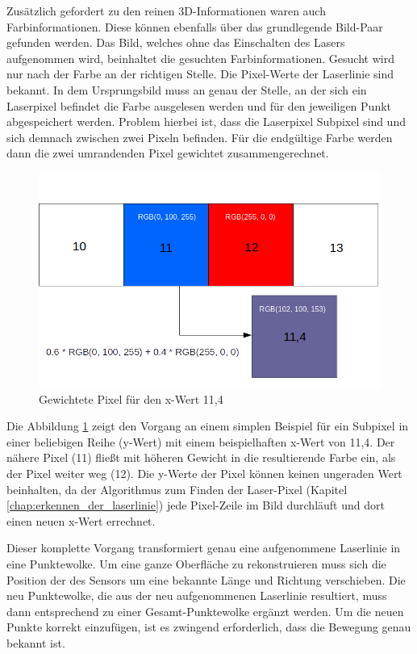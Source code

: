 	Zusätzlich gefordert zu den reinen 3D-Informationen waren auch Farbinformationen. Diese können ebenfalls über das grundlegende Bild-Paar gefunden werden. Das Bild, welches ohne das Einschalten des Lasers aufgenommen wird, beinhaltet die gesuchten Farbinformationen. Gesucht wird nur nach der Farbe an der richtigen Stelle. Die Pixel-Werte der Laserlinie sind bekannt. In dem Ursprungsbild muss an genau der Stelle, an der sich ein Laserpixel befindet die Farbe ausgelesen werden und für den jeweiligen Punkt abgespeichert werden. Problem hierbei ist, dass die Laserpixel Subpixel sind und sich demnach zwischen zwei Pixeln befinden. Für die endgültige Farbe werden dann die zwei umrandenden Pixel gewichtet zusammengerechnet.
	\begin{figure}
		\centering
		\includegraphics[width=0.85\linewidth]{img/hauptteil/bildverarbeitung/weighted_pixel.png}
		\caption{Gewichtete Pixel für den x-Wert 11,4}
		\label{fig:weighted_pixel}
	\end{figure}
	Die Abbildung \ref{fig:weighted_pixel} zeigt den Vorgang an einem simplen Beispiel für ein Subpixel in einer beliebigen Reihe (y-Wert) mit einem beispielhaften x-Wert von 11,4. Der nähere Pixel (11) fließt mit höheren Gewicht in die resultierende Farbe ein, als der Pixel weiter weg (12). Die y-Werte der Pixel können keinen ungeraden Wert beinhalten, da der Algorithmus zum Finden der Laser-Pixel (Kapitel \ref{chap:erkennen_der_laserlinie}) jede Pixel-Zeile im Bild durchläuft und dort einen neuen x-Wert errechnet.
	
	Dieser komplette Vorgang transformiert genau eine aufgenommene Laserlinie in eine Punktewolke. Um eine ganze Oberfläche zu rekonstruieren muss sich die Position der des Sensors um eine bekannte Länge und Richtung verschieben. Die neu Punktewolke, die aus der neu aufgenommenen Laserlinie resultiert, muss dann entsprechend zu einer Gesamt-Punktewolke ergänzt werden. Um die neuen Punkte korrekt einzufügen, ist es zwingend erforderlich, dass die Bewegung genau bekannt ist. 
	
